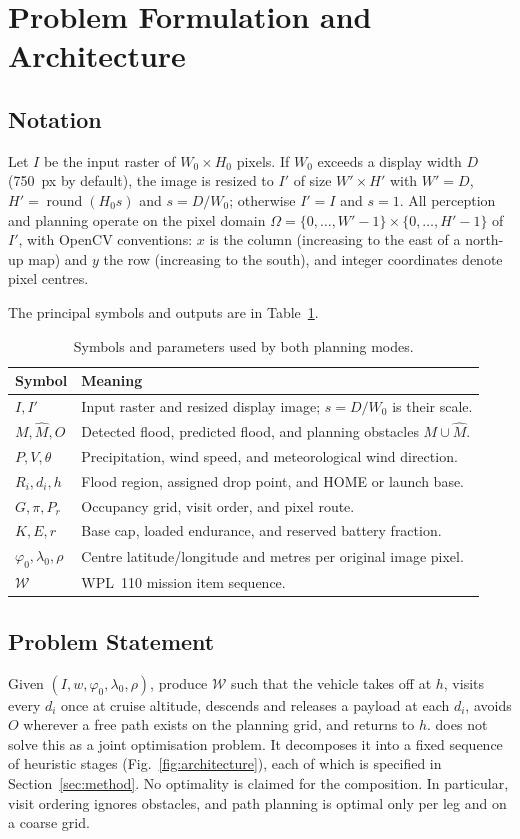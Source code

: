 \section{Problem Formulation and Architecture}
\label{sec:arch}

\subsection{Notation}
Let $I$ be the input raster of $W_0\times H_0$ pixels. If $W_0$ exceeds a display width $D$ (750~px by default), the image is resized to $I'$ of size $W'\times H'$ with $W'=D$, $H'=\operatorname{round}(H_0 s)$ and $s=D/W_0$; otherwise $I'=I$ and $s=1$. All perception and planning operate on the pixel domain $\Omega=\{0,\dots,W'-1\}\times\{0,\dots,H'-1\}$ of $I'$, with OpenCV conventions: $x$ is the column (increasing to the east of a north-up map) and $y$ the row (increasing to the south), and integer coordinates denote pixel centres.

The principal symbols and outputs are in Table~\ref{tab:symbols}.
\begin{table}[t]
\centering
\caption{Symbols and parameters used by both planning modes.}
\label{tab:symbols}
\footnotesize\setlength{\tabcolsep}{3pt}
\begin{tabular}{@{}p{1.05cm}p{6.6cm}@{}}
\toprule
Symbol & Meaning \\
\midrule
$I,I'$ & Input raster and resized display image; $s=D/W_0$ is their scale.\\
$M,\hat M,O$ & Detected flood, predicted flood, and planning obstacles $M\cup\hat M$.\\
$P,V,\theta$ & Precipitation, wind speed, and meteorological wind direction.\\
$R_i,d_i,h$ & Flood region, assigned drop point, and HOME or launch base.\\
$G,\pi,P_r$ & Occupancy grid, visit order, and pixel route.\\
$K,E,r$ & Base cap, loaded endurance, and reserved battery fraction.\\
$\varphi_0,\lambda_0,\rho$ & Centre latitude/longitude and metres per original image pixel.\\
$\mathcal W$ & WPL~110 mission item sequence.\\
\bottomrule
\end{tabular}
\end{table}

\subsection{Problem Statement}
Given $(I,w,\varphi_0,\lambda_0,\rho)$, produce $\mathcal{W}$ such that the vehicle takes off at $h$, visits every $d_i$ once at cruise altitude, descends and releases a payload at each $d_i$, avoids $O$ wherever a free path exists on the planning grid, and returns to $h$. \adapt{} does not solve this as a joint optimisation problem. It decomposes it into a fixed sequence of heuristic stages (Fig.~\ref{fig:architecture}), each of which is specified in Section~\ref{sec:method}. No optimality is claimed for the composition. In particular, visit ordering ignores obstacles, and path planning is optimal only per leg and on a coarse grid.

